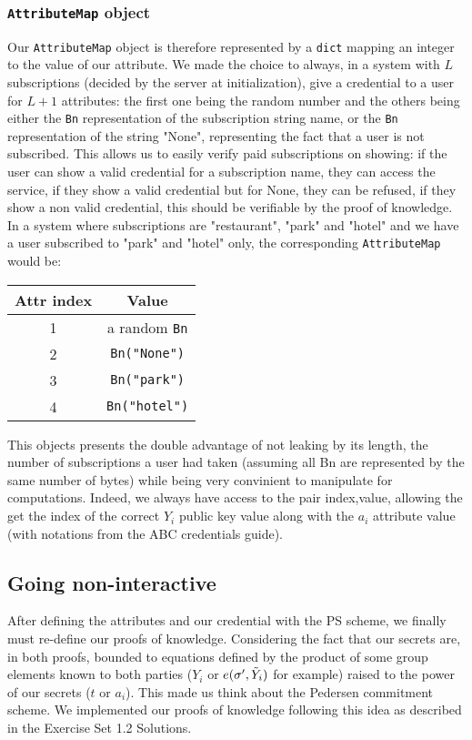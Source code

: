 \documentclass[10pt,conference,compsocconf]{IEEEtran}
\begin{document}
\subsubsection{\texttt{AttributeMap} object}
Our \texttt{AttributeMap} object is therefore represented by a \texttt{dict} mapping an integer to the value of our attribute. We made the choice to always, in a system with $L$ subscriptions (decided by the server at initialization), give a credential to a user for $L+1$ attributes: the first one being the random number and the others being either the \texttt{Bn} representation of the subscription string name, or the \texttt{Bn} representation of the string "None", representing the fact that a user is not subscribed. This allows us to easily verify paid subscriptions on showing: if the user can show a valid credential for a subscription name, they can access the service, if they show a valid credential but for None, they can be refused, if they show a non valid credential, this should be verifiable by the proof of knowledge. In a system where subscriptions are "restaurant", "park" and "hotel" and we have a user subscribed to "park" and "hotel" only, the corresponding \texttt{AttributeMap} would be:
\begin{center}
\begin{tabular}{||c c||} 
 \hline
 Attr index & Value \\ [0.5ex] 
 \hline\hline
 1 & a random \texttt{Bn} \\ 
 \hline
 2 & \texttt{Bn("None")} \\
 \hline
 3 & \texttt{Bn("park")} \\
 \hline
 4 & \texttt{Bn("hotel")} \\
 \hline
\end{tabular}
\end{center}
This objects presents the double advantage of not leaking by its length, the number of subscriptions a user had taken (assuming all Bn are represented by the same number of bytes) while being very convinient to manipulate for computations. Indeed, we always have access to the pair index,value, allowing the get the index of the correct $Y_i$ public key value along with the $a_i$ attribute value (with notations from the ABC credentials guide).
\subsection{Going non-interactive}
After defining the attributes and our credential with the PS scheme, we finally must re-define our proofs of knowledge. Considering the fact that our secrets are, in both proofs, bounded to equations defined by the product of some group elements known to both parties ($Y_i$ or $e(\sigma',\Tilde{Y}_i)$ for example) raised to the power of our secrets ($t$ or $a_i$). This made us think about the Pedersen commitment scheme. We implemented our proofs of knowledge following this idea as described in the Exercise Set 1.2 Solutions.
\end{document}
